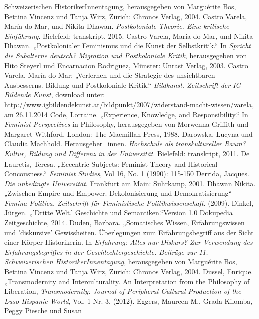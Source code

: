 \begin{thebibliography}{100}
{Schweizerischen HistorikerInnentagung}, herausgegeben von Marguérite Bos, Bettina Vincenz und Tanja Wirz, Zürich: Chronos Verlag, 2004.
 Castro Varela, María do Mar, und Nikita Dhawan. \emph{Postkoloniale Theorie. Eine kritische
Einführung}. Bielefeld: transkript, 2015.
 Castro Varela, María do Mar, und Nikita Dhawan. „Postkolonialer Feminismus und die Kunst der
Selbstkritik.“ In \emph{Spricht die Subalterne deutsch? Migration und
Postkoloniale Kritik},
herausgegeben von Hito Steyerl und Encarnacion Rodriguez, Münster: Unrast Verlag, 2003.
 Castro Varela, María do Mar: „Verlernen und die Strategie des unsichtbaren Ausbesserns. Bildung 
und Postkoloniale Kritik.“ \emph{Bildkunst. Zeitschrift der IG Bildende Kunst},
download unter:
\url{http://www.igbildendekunst.at/bildpunkt/2007/widerstand-macht-wissen/varela}, am 26.11.2014
 Code, Lorraine. „Experience, Knowledge, and Responsibility.“ In
\emph{Feminist Perspectives} in
Philosophy, herausgegeben von Morwenna Griffith und Margaret Withford, London: The Macmillan Press, 1988. 
 Darowska, Lucyna und Claudia Machhold. Herausgeber\_innen.
\emph{Hochschule als transkultureller
Raum? Kultur, Bildung und Differenz in der Universität}. Bielefeld: transkript, 2011. 
 De Lauretis, Teresa. „Eccentric Subjects: Feminist Theory
and Historical Concousness.“ \emph{Feminist Studies}, Vol 16, No. 1 (1990): 115-150 
 Derrida, Jacques. \emph{Die unbedingte Universität}. Frankfurt am Main: Suhrkamp, 2001.
 Dhawan Nikita. „Zwischen Empire und Empower. Dekolonisierung und Demokratisierung“ 
\emph{Femina Politica. Zeitschrift für Feministische Politikwissenschaft}. (2009).
 Dinkel, Jürgen. „'Dritte Welt.' Geschichte und Semantiken.“Version 1.0 Dokupedia Zeitgeschichte,
     2014. 
 Duden, Barbara. „Somatisches Wissen, Erfahrungswissen und 'diskursive' Gewissheiten.
Überlegungen zum Erfahrungsbegriff aus der Sicht einer Körper-Historikerin. In
\emph{Erfahrung: Alles nur Diskurs? Zur Verwendung des Erfahrungsbegriffes in
  der Geschlechtergeschichte. Beiträge zur 11. Schweizerischen
HistorikerInnentagung}, herausgegeben von Marguérite Bos, Bettina Vincenz und Tanja Wirz,  Zürich: Chronos Verlag, 2004.
 Dussel, Enrique. „Transmodernity and Interculturality. An Interpretation from the Philosophy of
Liberation, \emph{Transmodernity: Journal of Peripheral Cultural Production
of the Luso-Hispanic World}, Vol. 1 Nr. 3, (2012).
 Eggers, Maureen M., Grada Kilomba, Peggy Piesche und Susan

\end{thebibliography}
